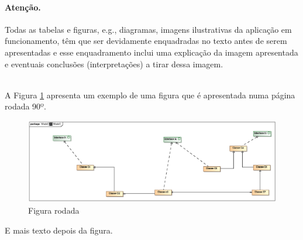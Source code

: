 \paragraph{Atenção.} Todas as tabelas e figuras, e.g., diagramas, imagens ilustrativas da aplicação em funcionamento, têm que ser devidamente enquadradas no texto antes de serem apresentadas e esse enquadramento inclui uma explicação da imagem apresentada e eventuais conclusões (interpretações) a tirar dessa imagem.

\mbox{} \\

A Figura \ref{fig:umafiguraR} apresenta um exemplo de uma figura que é apresentada numa página rodada 90º.

\begin{landscape}
\begin{figure}[h!]
	\centering
	\includegraphics{./Model.eps}
	\caption{Figura rodada}
	\label{fig:umafiguraR}
\end{figure}
\end{landscape}

E mais texto depois da figura.